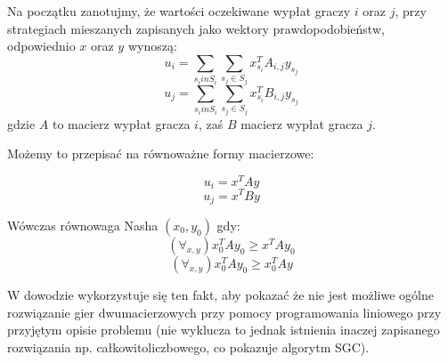 \documentclass[polish]{standalone}
\begin{document}
Na początku zanotujmy, że wartości oczekiwane wypłat graczy $i$ oraz $j$, przy strategiach mieszanych zapisanych jako
wektory prawdopodobieństw, odpowiednio $x$ oraz $y$ wynoszą:
$$u_i = \sum_{s_i in S_i}\sum_{s_j \in S_j} x_{s_i}^{T} A_{i,j} y_{s_j}$$
$$u_j = \sum_{s_i in S_i}\sum_{s_j \in S_j} x_{s_i}^{T} B_{i,j} y_{s_j}$$
gdzie $A$ to macierz wypłat gracza $i$, zaś $B$ macierz wypłat gracza $j$.

Możemy to przepisać na równoważne formy macierzowe:

\begin{equation}
u_i = x^{T} A y \label{LHa1}
\end{equation}
\begin{equation}
u_j = x^{T} B y \label{LHa2}
\end{equation}

Wówczas równowaga Nasha $(x_0, y_0)$ gdy:
$$(\forall_{x,y}) x_0^T A y_0 \geq x^T A y_0$$
$$(\forall_{x,y}) x_0^T A y_0 \geq x_0^T A y$$

W dowodzie wykorzystuje się ten fakt, aby pokazać że nie jest możliwe ogólne rozwiązanie gier dwumacierzowych przy
pomocy programowania liniowego przy przyjętym opisie problemu (nie wyklucza to jednak istnienia inaczej zapisanego
rozwiązania np. całkowitoliczbowego, co pokazuje algorytm SGC).
\end{document}
